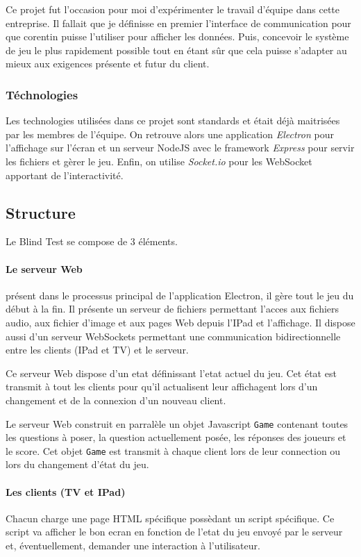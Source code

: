 \documentclass{article}
\begin{document}
Ce projet fut l'occasion pour moi d'expérimenter le travail d'équipe dans cette entreprise.
Il fallait que je définisse en premier l'interface de communication pour que corentin puisse l'utiliser pour afficher les données.
Puis, concevoir le système de jeu le plus rapidement possible tout en étant sûr que cela puisse s'adapter au mieux aux exigences présente et futur du client.

\subsubsection{Téchnologies}

Les technologies utilisées dans ce projet sont standards et était déjà maitrisées par les membres de l'équipe.
On retrouve alors une application \emph{Electron} pour l'affichage sur l'écran et un serveur NodeJS avec le framework \emph{Express} pour servir les fichiers et gèrer le jeu.
Enfin, on utilise \emph{Socket.io} pour les WebSocket apportant de l'interactivité.

\subsection{Structure}

Le Blind Test se compose de 3 éléments.

\paragraph{Le serveur Web} présent dans le processus principal de l'application Electron, il gère tout le jeu du début à la fin.
Il présente un serveur de fichiers permettant l'acces aux fichiers audio, aux fichier d'image et aux pages Web depuis l'IPad et l'affichage.
Il dispose aussi d'un serveur WebSockets permettant une communication bidirectionnelle entre les clients (IPad et TV) et le serveur.

Ce serveur Web dispose d'un etat définissant l'etat actuel du jeu.
Cet état est transmit à tout les clients pour qu'il actualisent leur affichagent lors d'un changement et de la connexion d'un nouveau client.

Le serveur Web construit en parralèle un objet Javascript \texttt{Game} contenant toutes les questions à poser, la question actuellement posée, les réponses des joueurs et le score.
Cet objet \texttt{Game} est transmit à chaque client lors de leur connection ou lors du changement d'état du jeu.

\paragraph{Les clients (TV et IPad)} Chacun charge une page HTML spécifique possèdant un script spécifique.
Ce script va afficher le bon ecran en fonction de l'etat du jeu envoyé par le serveur et, éventuellement, demander une interaction à l'utilisateur.
\end{document}
